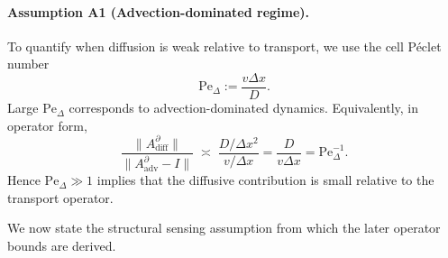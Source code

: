 \paragraph{Assumption A1 (Advection-dominated regime).}
To quantify when diffusion is weak relative to transport, we use the cell P\'eclet number
\begin{equation}
\mathrm{Pe}_{\Delta} := \frac{v\Delta x}{D}.
\label{eq:peclet_cell}
\end{equation}
Large $\mathrm{Pe}_{\Delta}$ corresponds to advection-dominated dynamics. Equivalently, in operator form,
\begin{equation}
\frac{\|A_{\mathrm{diff}}^{\partial}\|}{\|A_{\mathrm{adv}}^{\partial}-I\|}
\;\asymp\;
\frac{D/\Delta x^2}{v/\Delta x}
=
\frac{D}{v\Delta x}
=
\mathrm{Pe}_{\Delta}^{-1}.
\label{eq:operator_ratio}
\end{equation}
Hence $\mathrm{Pe}_{\Delta}\gg 1$ implies that the diffusive contribution is small relative to the transport operator.

We now state the structural sensing assumption from which the later operator bounds are derived.



